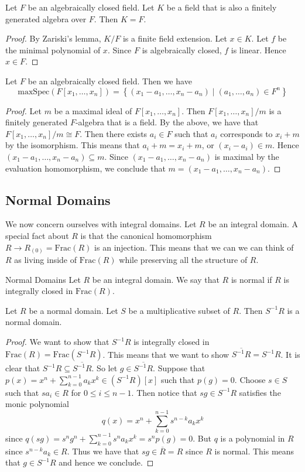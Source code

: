 \documentclass[a4paper]{article}
\begin{document}
\begin{crl}{}{} Let $F$ be an algebraically closed field. Let $K$ be a field that is also a finitely generated algebra over $F$. Then $K=F$. 
\begin{proof}
By Zariski's lemma, $K/F$ is a finite field extension. Let $x\in K$. Let $f$ be the minimal polynomial of $x$. Since $F$ is algebraically closed, $f$ is linear. Hence $x\in F$. 
\end{proof}
\end{crl}

\begin{crl}{}{} Let $F$ be an algebraically closed field. Then we have $$\text{maxSpec}(F[x_1,\dots,x_n])=\left\{(x_1-a_1,\dots,x_n-a_n)\;|\;(a_1,\dots,a_n)\in F^n\right\}$$ 
\begin{proof}
Let $m$ be a maximal ideal of $F[x_1,\dots,x_n]$. Then $F[x_1,\dots,x_n]/m$ is a finitely generated $F$-algebra that is a field. By the above, we have that $F[x_1,\dots,x_n]/m\cong F$. Then there exists $a_i\in F$ such that $a_i$ corresponds to $x_i+m$ by the isomorphism. This means that $a_i+m=x_i+m$, or $(x_i-a_i)\in m$. Hence $(x_1-a_1,\dots,x_n-a_n)\subseteq m$. Since $(x_1-a_1,\dots,x_n-a_n)$ is maximal by the evaluation homomorphism, we conclude that $m=(x_1-a_1,\dots,x_n-a_n)$. 
\end{proof}
\end{crl}

\subsection{Normal Domains}
We now concern ourselves with integral domains. Let $R$ be an integral domain. A special fact about $R$ is that the canonical homomorphism $R\to R_{(0)}=\text{Frac}(R)$ is an injection. This means that we can we can think of $R$ as living inside of $\text{Frac}(R)$ while preserving all the structure of $R$. 

\begin{defn}{Normal Domains}{} Let $R$ be an integral domain. We say that $R$ is normal if $R$ is integrally closed in $\text{Frac}(R)$. 
\end{defn}

\begin{prp}{}{} Let $R$ be a normal domain. Let $S$ be a multiplicative subset of $R$. Then $S^{-1}R$ is a normal domain. 
\begin{proof}
We want to show that $S^{-1}R$ is integrally closed in $\text{Frac}(R)=\text{Frac}(S^{-1}R)$. This means that we want to show $\overline{S^{-1}R}=S^{-1}R$. It is clear that $S^{-1}R\subseteq\overline{S^{-1}R}$. So let $g\in\overline{S^{-1}R}$. Suppose that $p(x)=x^n+\sum_{k=0}^{n-1}a_kx^k\in (S^{-1}R)[x]$ such that $p(g)=0$. Choose $s\in S$ such that $sa_i\in R$ for $0\leq i\leq n-1$. Then notice that $sg\in S^{-1}R$ satisfies the monic polynomial $$q(x)=x^n+\sum_{k=0}^{n-1}s^{n-k}a_kx^k$$ since $q(sg)=s^ng^n+\sum_{k=0}^{n-1}s^na_kx^k=s^np(g)=0$. But $q$ is a polynomial in $R$ since $s^{n-k}a_k\in R$. Thus we have that $sg\in\overline{R}=R$ since $R$ is normal. This means that $g\in S^{-1}R$ and hence we conclude. 
\end{proof}
\end{prp}
\end{document}
